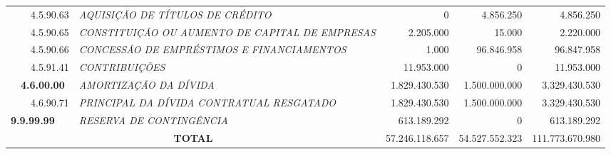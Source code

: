 \documentclass{article}
\begin{document}
\begin{longtable}[c]{m{0.1cm}m{0.1cm}m{0.8cm}|m{8cm}|m{2cm}|m{2cm}|m{2cm}}
\multicolumn{1}{l}{} & \multicolumn{1}{l}{} & \multicolumn{1}{l|}{4.5.90.63} & \multicolumn{1}{L{8cm}|}{\textit{AQUISIÇÃO DE TÍTULOS DE CRÉDITO}} & \multicolumn{1}{r|}{             0} & \multicolumn{1}{r|}{4.856.250} &  \multicolumn{1}{r}{4.856.250}\\
\multicolumn{1}{l}{} & \multicolumn{1}{l}{} & \multicolumn{1}{l|}{4.5.90.65} & \multicolumn{1}{L{8cm}|}{\textit{CONSTITUIÇÃO OU AUMENTO DE CAPITAL DE EMPRESAS}} & \multicolumn{1}{r|}{2.205.000} & \multicolumn{1}{r|}{15.000} &  \multicolumn{1}{r}{2.220.000}\\
\multicolumn{1}{l}{} & \multicolumn{1}{l}{} & \multicolumn{1}{l|}{4.5.90.66} & \multicolumn{1}{L{8cm}|}{\textit{CONCESSÃO DE EMPRÉSTIMOS E FINANCIAMENTOS}} & \multicolumn{1}{r|}{1.000} & \multicolumn{1}{r|}{96.846.958} &  \multicolumn{1}{r}{96.847.958}\\
\multicolumn{1}{l}{} & \multicolumn{1}{l}{} & \multicolumn{1}{l|}{4.5.91.41} & \multicolumn{1}{L{8cm}|}{\textit{CONTRIBUIÇÕES}} & \multicolumn{1}{r|}{11.953.000} & \multicolumn{1}{r|}{             0} &  \multicolumn{1}{r}{11.953.000}\\
\multicolumn{1}{l}{} & \multicolumn{2}{l|}{\textbf{4.6.00.00}} & \multicolumn{1}{L{8cm}|}{\textit{AMORTIZAÇÃO DA DÍVIDA}} & \multicolumn{1}{r|}{1.829.430.530} & \multicolumn{1}{r|}{1.500.000.000} &  \multicolumn{1}{r}{3.329.430.530}\\
\multicolumn{1}{l}{} & \multicolumn{1}{l}{} & \multicolumn{1}{l|}{4.6.90.71} & \multicolumn{1}{L{8cm}|}{\textit{PRINCIPAL DA DÍVIDA CONTRATUAL RESGATADO}} & \multicolumn{1}{r|}{1.829.430.530} & \multicolumn{1}{r|}{1.500.000.000} &  \multicolumn{1}{r}{3.329.430.530}\\
\multicolumn{3}{l|}{\textbf{9.9.99.99}} & \multicolumn{1}{L{8cm}|}{\textit{RESERVA DE CONTINGÊNCIA}} & \multicolumn{1}{r|}{613.189.292} & \multicolumn{1}{r|}{             0} &  \multicolumn{1}{r}{613.189.292}\\
\hline
\multicolumn{4}{c|}{\textbf{TOTAL}} & \multicolumn{1}{r|}{57.246.118.657} & \multicolumn{1}{r|}{54.527.552.323} &  \multicolumn{1}{r}{111.773.670.980}\end{longtable}

 
\end{document}
